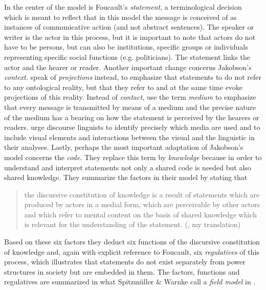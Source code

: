 In the center of the model is Foucault’s \textit{statement}, a terminological decision which is meant to reflect that in this model the message is conceived of as instances of communicative action (and not abstract sentences). The speaker or writer is the actor in this process, but it is important to note that actors do not have to be persons, but can also be institutions, specific groups or individuals representing specific social functions (e.g. politicians). The statement links the actor and the hearer or reader. Another important change concerns Jakobson’s \textit{context}. \citet{Spitzmuller2011} speak of \textit{projections} instead, to emphasize that statements to do not refer to any ontological reality, but that they refer to and at the same time evoke projections of this reality. Instead of \textit{contact}, \citet{Spitzmuller2011} use the term \textit{medium} to emphasize that every message is transmitted by means of a medium and the precise nature of the medium has a bearing on how the statement is perceived by the hearers or readers. \citet{Spitzmuller2011} urge discourse linguists to identify precisely which media are used and to include visual elements and interactions between the visual and the linguistic in their analyses. Lastly, perhaps the most important adaptation of Jakobson’s model concerns the \textit{code}. They replace this term by \textit{knowledge} because in order to understand and interpret statements not only a shared code is needed but also shared knowledge. They summarize the factors in their model by stating that


\begin{quote}
the discursive constitution of knowledge is a result of statements which are produced by actors in a medial form, which are perceivable by other actors and which refer to mental content on the basis of shared knowledge which is relevant for the understanding of the statement. (\citealt[57]{Spitzmuller2011}, my translation)
\end{quote}


Based on these six factors they deduct six functions of the discursive constitution of knowledge and, again with explicit reference to Foucault, six \textit{regulatives} of this process, which illustrates that statements do not exist separately from power structures in society but are embedded in them. The factors, functions and regulatives are summarized in what Spitzmüller \& Warnke call a \textit{field model} in .


